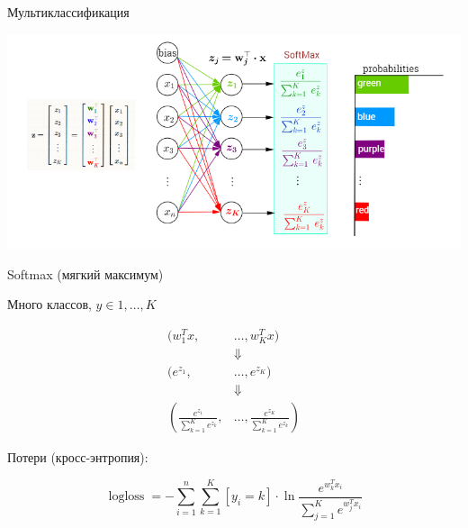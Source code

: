 \documentclass[notes,12pt, aspectratio=169]{beamer}
\DeclareMathOperator{\logloss}{logloss}
\begin{document}
\begin{frame}{Мультиклассификация}
\begin{center}
\includegraphics[width=0.9\paperwidth]{softmax.png}
\end{center}
\end{frame}


\begin{frame}{Softmax (мягкий максимум)}

Много классов, $y \in {1, \ldots, K}$

\begin{equation*}
\begin{aligned}
(w_1^T x, &\ldots, w_K^Tx) \\
&\Downarrow \\
(e^{z_1}, &\ldots, e^{z_K}) \\
&\Downarrow \\
\left(\frac{e^{z_1}}{\sum_{k=1}^K e^{z_k}}\right., &\ldots,\left. \frac{e^{z_K}}{\sum_{k=1}^K e^{z_k}}  \right)
\end{aligned}
\end{equation*}

Потери (кросс-энтропия): 

\[
\logloss =  - \sum_{i=1}^n \sum_{k=1}^K [y_i = k] \cdot \ln \frac{e^{w_k^Tx_i}}{\sum_{j=1}^{K} e^{w_j^Tx_i}}
\]
\end{frame}
\end{document}
